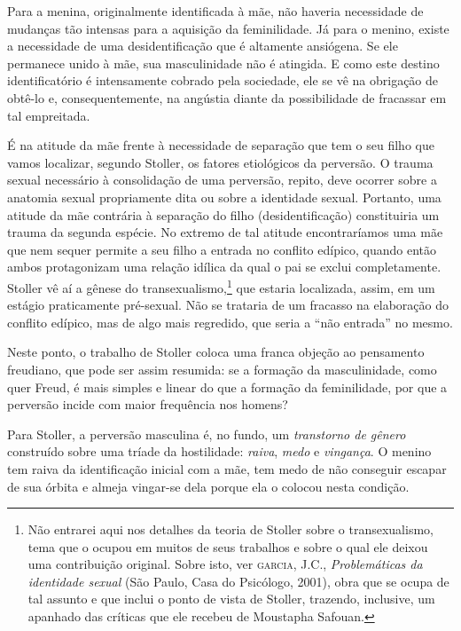 Para a menina, originalmente identificada à mãe, não haveria necessidade de
mudanças tão intensas para a aquisição da feminilidade. Já para o menino,
existe a necessidade de uma desidentificação que é altamente ansiógena. Se
ele permanece unido à mãe, sua masculinidade não é atingida. E como este
destino identificatório é intensamente cobrado pela sociedade, ele se vê na
obrigação de obtê-lo e, consequentemente, na angústia diante da
possibilidade de fracassar em tal empreitada.

É na atitude da mãe frente à necessidade de separação que tem o seu filho
que vamos localizar, segundo Stoller, os fatores etiológicos da perversão.
O trauma sexual necessário à consolidação de uma perversão, repito, deve
ocorrer sobre a anatomia sexual propriamente dita ou sobre a identidade
sexual. Portanto, uma atitude da mãe contrária à separação do filho
(desidentificação) constituiria um trauma da segunda espécie. No extremo de
tal atitude encontraríamos uma mãe que nem sequer permite a seu filho a
entrada no conflito edípico, quando então ambos protagonizam uma relação
idílica da qual o pai se exclui completamente. Stoller vê aí a gênese do
transexualismo,\footnote{ Não entrarei aqui nos detalhes da teoria de
Stoller sobre o transexualismo, tema que o ocupou em muitos de seus
trabalhos e sobre o qual ele deixou uma contribuição original. Sobre isto,
ver \textsc{garcia}, J.C., \textit{Problemáticas da identidade sexual} (São Paulo,
Casa do Psicólogo, 2001), obra que se ocupa de tal assunto e que inclui o
ponto de vista de Stoller, trazendo, inclusive, um apanhado das críticas
que ele recebeu de Moustapha Safouan.} que estaria localizada, assim, em
um estágio praticamente pré-sexual. Não se trataria de um fracasso na
elaboração do conflito edípico, mas de algo mais regredido, que seria a
“não entrada” no mesmo.

Neste ponto, o trabalho de Stoller coloca uma franca objeção ao pensamento
freudiano, que pode ser assim resumida: se a formação da masculinidade,
como quer Freud, é mais simples e linear do que a formação da feminilidade,
por que a perversão incide com maior frequência nos homens?

Para Stoller, a perversão masculina é, no fundo, um \textit{transtorno de
gênero} construído sobre uma tríade da hostilidade: \textit{raiva},
\textit{medo} e \textit{vingança}. O menino tem raiva da identificação
inicial com a mãe, tem medo de não conseguir escapar de sua órbita e almeja
vingar-se dela porque ela o colocou nesta condição.

